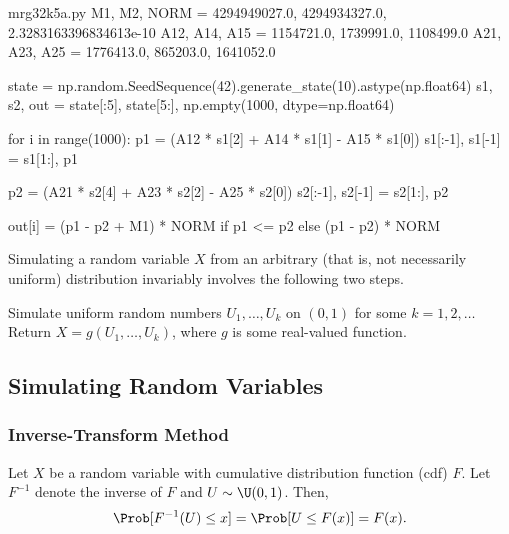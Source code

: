 \begin{Pcode}{mrg32k5a.py}
	M1, M2, NORM = 4294949027.0, 4294934327.0, 2.3283163396834613e-10
	A12, A14, A15 = 1154721.0, 1739991.0, 1108499.0
	A21, A23, A25 = 1776413.0, 865203.0, 1641052.0

	state = np.random.SeedSequence(42).generate_state(10).astype(np.float64)
	s1, s2, out = state[:5], state[5:], np.empty(1000, dtype=np.float64)

	for i in range(1000):
	p1 = (A12 * s1[2] + A14 * s1[1] - A15 * s1[0]) %
	s1[:-1], s1[-1] = s1[1:], p1

	p2 = (A21 * s2[4] + A23 * s2[2] - A25 * s2[0]) %
	s2[:-1], s2[-1] = s2[1:], p2

	out[i] = (p1 - p2 + M1) * NORM if p1 <= p2 else (p1 - p2) * NORM
\end{Pcode}

Simulating a random variable $X$ from an arbitrary (that is, not necessarily uniform) distribution invariably involves the following two steps.
\begin{algorithm}[H]
	\caption{Simulation of Random Variable $X$}
	\label{alg:SimulationRandomVariableX}
	\begin{algorithmic}[1]
		\State Simulate uniform random numbers $U_1, \dots, U_k$ on $(0, 1)$ for some $k = 1, 2, \dots$
		\State Return $X = g(U_1, \dots, U_k)$, where $g$ is some real-valued function.
	\end{algorithmic}
\end{algorithm}

\subsection{Simulating Random Variables}

\subsubsection{Inverse-Transform Method}
Let $X$ be a random variable with cumulative distribution function (cdf) $F$. Let $F^{-1}$ denote the inverse  of $F$ and $U \sim \U(0, 1)$. Then,
\begin{equation}
	\Prob[F^{-1}(U) \le x] = \Prob[U \le F(x)] = F(x).
\end{equation}

